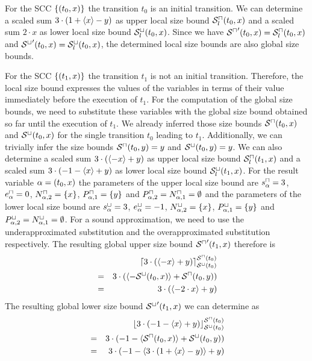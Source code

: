 \begin{example}
  For the SCC $\lbrace (t_0,x) \rbrace$ the transition $t_0$ is an initial transition.
  We can determine a scaled sum $3 \cdot (1 + \langle x\rangle - y)$ as upper local size bound ${\mathcal{S}^\sqcap_l}(t_0,x)$ and a scaled sum $2 \cdot x$ as lower local size bound ${\mathcal{S}^\sqcup_l}(t_0,x)$.
  Since we have ${\mathcal{S}^\sqcap}'(t_0,x) = {\mathcal{S}^\sqcap_l}(t_0,x)$ and ${\mathcal{S}^\sqcup}'(t_0,x) = {\mathcal{S}^\sqcup_l}(t_0,x)$, the determined local size bounds are also global size bounds.
\end{example}
  
\begin{example}
  For the SCC $\lbrace (t_1,x) \rbrace$ the transition $t_1$ is not an initial transition.
  Therefore, the local size bound expresses the values of the variables in terms of their value immediately before the execution of $t_1$.
  For the computation of the global size bounds, we need to substitute these variables with the global size bound obtained so far until the execution of $t_1$.
  We already inferred those size bounds ${\mathcal{S}^\sqcap}(t_0,x)$ and ${\mathcal{S}^\sqcup}(t_0,x)$ for the single transition $t_0$ leading to $t_1$.
  Additionally, we can trivially infer the size bounds ${\mathcal{S}^\sqcap}(t_0,y) = y$ and ${\mathcal{S}^\sqcup}(t_0,y) = y$.
  We can also determine a scaled sum $3 \cdot (\langle-x\rangle + y)$ as upper local size bound ${\mathcal{S}^\sqcap_l}(t_1,x)$ and a scaled sum $3 \cdot (-1 - \langle x\rangle + y)$ as lower local size bound ${\mathcal{S}^\sqcup_l}(t_1,x)$.
  For the result variable $\alpha = (t_0,x)$ the parameters of the upper local size bound are $s^\sqcap_\alpha = 3$, $e^\sqcap_\alpha = 0$, $N^\sqcap_{\alpha,2} = \lbrace x \rbrace$, $P^\sqcap_{\alpha,1} = \lbrace y \rbrace$ and $P^\sqcap_{\alpha,2} = N^\sqcap_{\alpha,1} = \emptyset$ and the parameters of the lower local size bound are $s^\sqcup_\alpha = 3$, $e^\sqcup_\alpha = -1$, $N^\sqcup_{\alpha,2} = \lbrace x \rbrace$, $P^\sqcup_{\alpha,1} = \lbrace y \rbrace$ and $P^\sqcup_{\alpha,2} = N^\sqcup_{\alpha,1} = \emptyset$.
  For a sound approximation, we need to use the underapproximated substitution and the overapproximated substitution respectively.
  The resulting global upper size bound ${\mathcal{S}^\sqcap}'(t_1,x)$ therefore is 
  \begin{align*}
    && \lceil 3 \cdot \left( \langle-x\rangle + y \right)  \rceil^{{\mathcal{S}^\sqcap}(t_0)}_{{\mathcal{S}^\sqcup}(t_0)} \\
    & = & 3 \cdot \left( \langle-{\mathcal{S}^\sqcup}(t_0, x)\rangle + {\mathcal{S}^\sqcap}(t_0, y) \right) \\
    & = & 3 \cdot \left( \langle-2 \cdot x\rangle + y \right)
  \end{align*}
  The resulting global lower size bound ${\mathcal{S}^\sqcup}'(t_1,x)$ we can determine as
  \begin{align*}
    && \lfloor 3 \cdot \left( -1 - \langle x\rangle + y \right)  \rfloor^{{\mathcal{S}^\sqcap}(t_0)}_{{\mathcal{S}^\sqcup}(t_0)} \\
    & = & 3 \cdot \left( -1 - \langle{\mathcal{S}^\sqcap}(t_0, x)\rangle + {\mathcal{S}^\sqcup}(t_0, y) \right) \\
    & = & 3 \cdot \left( -1 - \langle3 \cdot (1 + \langle x\rangle - y)\rangle + y \right)
  \end{align*}
\end{example}
